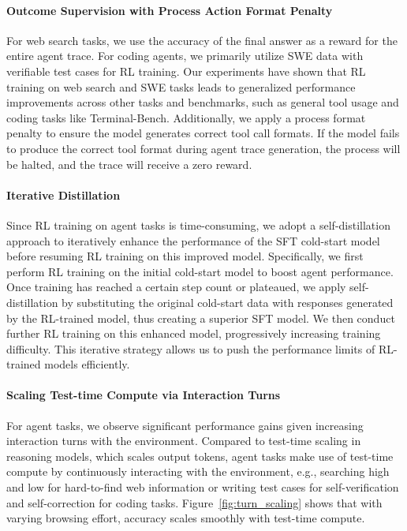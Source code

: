 \documentclass{article}
\theoremstyle{definition}
\begin{document}
\paragraph{Outcome Supervision with Process Action Format Penalty} For web search tasks, we use the accuracy of the final answer as a reward for the entire agent trace. For coding agents, we primarily utilize SWE data with verifiable test cases for RL training. Our experiments have shown that RL training on web search and SWE tasks leads to generalized performance improvements across other tasks and benchmarks, such as general tool usage and coding tasks like Terminal-Bench. Additionally, we apply a process format penalty to ensure the model generates correct tool call formats. If the model fails to produce the correct tool format during agent trace generation, the process will be halted, and the trace will receive a zero reward.

\paragraph{Iterative Distillation} Since RL training on agent tasks is time-consuming, we adopt a self-distillation approach to iteratively enhance the performance of the SFT cold-start model before resuming RL training on this improved model. Specifically, we first perform RL training on the initial cold-start model to boost agent performance. Once training has reached a certain step count or plateaued, we apply self-distillation by substituting the original cold-start data with responses generated by the RL-trained model, thus creating a superior SFT model. We then conduct further RL training on this enhanced model, progressively increasing training difficulty. This iterative strategy allows us to push the performance limits of RL-trained models efficiently.

\paragraph{Scaling Test-time Compute via Interaction Turns} For agent tasks, we observe significant performance gains given increasing interaction turns with the environment. Compared to test-time scaling in reasoning models, which scales output tokens, agent tasks make use of test-time compute by continuously interacting with the environment, e.g., searching high and low for hard-to-find web information or writing test cases for self-verification and self-correction for coding tasks. 
Figure~\ref{fig:turn_scaling} shows that with varying browsing effort,  accuracy scales smoothly with test-time compute.
\end{document}

